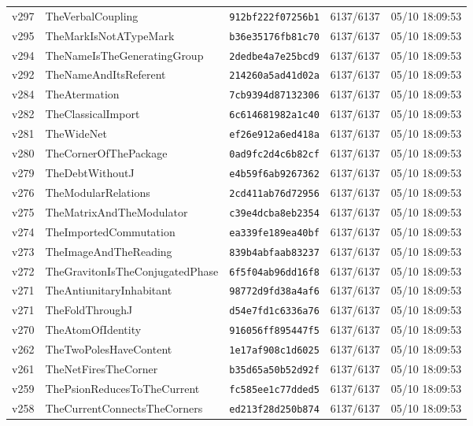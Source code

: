 \documentclass[11pt]{article}
\theoremstyle{definition}\newtheorem{deriv}{Derivação}
\begin{document}
{\begin{longtable}{@{}lllll@{}}
v297 & TheVerbalCoupling & \texttt{912bf222f07256b1} & 6137/6137 & 05/10 18:09:53 \\
v295 & TheMarkIsNotATypeMark & \texttt{b36e35176fb81c70} & 6137/6137 & 05/10 18:09:53 \\
v294 & TheNameIsTheGeneratingGroup & \texttt{2dedbe4a7e25bcd9} & 6137/6137 & 05/10 18:09:53 \\
v292 & TheNameAndItsReferent & \texttt{214260a5ad41d02a} & 6137/6137 & 05/10 18:09:53 \\
v284 & TheAtermation & \texttt{7cb9394d87132306} & 6137/6137 & 05/10 18:09:53 \\
v282 & TheClassicalImport & \texttt{6c614681982a1c40} & 6137/6137 & 05/10 18:09:53 \\
v281 & TheWideNet & \texttt{ef26e912a6ed418a} & 6137/6137 & 05/10 18:09:53 \\
v280 & TheCornerOfThePackage & \texttt{0ad9fc2d4c6b82cf} & 6137/6137 & 05/10 18:09:53 \\
v279 & TheDebtWithoutJ & \texttt{e4b59f6ab9267362} & 6137/6137 & 05/10 18:09:53 \\
v276 & TheModularRelations & \texttt{2cd411ab76d72956} & 6137/6137 & 05/10 18:09:53 \\
v275 & TheMatrixAndTheModulator & \texttt{c39e4dcba8eb2354} & 6137/6137 & 05/10 18:09:53 \\
v274 & TheImportedCommutation & \texttt{ea339fe189ea40bf} & 6137/6137 & 05/10 18:09:53 \\
v273 & TheImageAndTheReading & \texttt{839b4abfaab83237} & 6137/6137 & 05/10 18:09:53 \\
v272 & TheGravitonIsTheConjugatedPhase & \texttt{6f5f04ab96dd16f8} & 6137/6137 & 05/10 18:09:53 \\
v271 & TheAntiunitaryInhabitant & \texttt{98772d9fd38a4af6} & 6137/6137 & 05/10 18:09:53 \\
v271 & TheFoldThroughJ & \texttt{d54e7fd1c6336a76} & 6137/6137 & 05/10 18:09:53 \\
v270 & TheAtomOfIdentity & \texttt{916056ff895447f5} & 6137/6137 & 05/10 18:09:53 \\
v262 & TheTwoPolesHaveContent & \texttt{1e17af908c1d6025} & 6137/6137 & 05/10 18:09:53 \\
v261 & TheNetFiresTheCorner & \texttt{b35d65a50b52d92f} & 6137/6137 & 05/10 18:09:53 \\
v259 & ThePsionReducesToTheCurrent & \texttt{fc585ee1c77dded5} & 6137/6137 & 05/10 18:09:53 \\
v258 & TheCurrentConnectsTheCorners & \texttt{ed213f28d250b874} & 6137/6137 & 05/10 18:09:53 \\

\end{longtable}}
\end{document}
